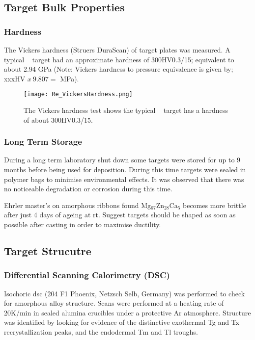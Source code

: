 \documentclass[a4paper,12pt,oneside]{report}%
\begin{document}
\subsection{Target Bulk Properties}
\subsubsection{Hardness}
The Vickers hardness (Struers DuraScan) of target plates was measured. A typical \MgZnCa~ target had an approximate hardness of 300HV0.3/15; equivalent to about 2.94 GPa (Note: Vickers hardness to pressure equivalence is given by; xxxHV $x~ 9.807 =$ MPa).

\begin{figure}[htbp]
	\centering
	\texttt{[image: Re\_VickersHardness.png]}
	\caption{The Vickers hardness test shows the typical \MgZnCa~ target has a hardness of about 300HV0.3/15.}
	\label{fig:TargetHV}
\end{figure}

\subsubsection{Long Term Storage}
During a long term laboratory shut down some targets were stored for up to 9 months before being used for deposition. During this time targets were sealed in polymer bags to minimise environmental effects. It was observed that there was no noticeable degradation or corrosion during this time.

Ehrler \cite{Ehrler2008} master's on amorphous ribbons found Mg$_{67}$Zn$_{28}$Ca$_{5}$ becomes more brittle after just 4 days of ageing at \gls{rt}. Suggest targets should be shaped as soon as possible after casting in order to maximise ductility. 

\subsection{Target Strucutre} 
\subsubsection{Differential Scanning Calorimetry (DSC)}
Isochoric \gls{dsc} (204 F1 Phoenix, Netzsch Selb, Germany) was performed to check for amorphous alloy structure. Scans were performed at a heating rate of 20K/min in sealed alumina crucibles under a protective Ar atmosphere. Structure was identified by looking for evidence of the distinctive exothermal \gls{Tg} and \gls{Tx} recrystallization peaks, and the endodermal \gls{Tm} and \gls{Tl} troughs.
\end{document}
